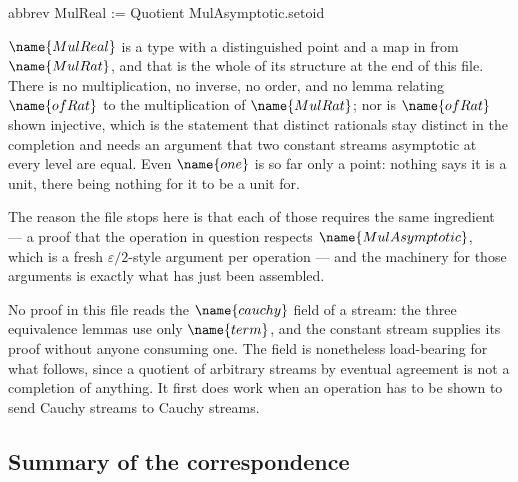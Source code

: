 \begin{leancode}
abbrev MulReal := Quotient MulAsymptotic.setoid
\end{leancode}

\begin{remark}
\label{Completion:rem:what-remains}
$\name{MulReal}$ is a type with a distinguished point and a map in from
$\name{MulRat}$, and that is the whole of its structure at the end of this
file.  There is no multiplication, no inverse, no order, and no lemma
relating $\name{ofRat}$ to the multiplication of $\name{MulRat}$; nor is
$\name{ofRat}$ shown injective, which is the statement that distinct rationals
stay distinct in the completion and needs an argument that two constant streams
asymptotic at every level are equal.  Even $\name{one}$ is so far only a point:
nothing says it is a unit, there being nothing for it to be a unit for.

The reason the file stops here is that each of those requires the same
ingredient --- a proof that the operation in question respects
$\name{MulAsymptotic}$, which is a fresh $\varepsilon/2$-style argument per
operation --- and the machinery for those arguments is exactly what has just
been assembled.
\end{remark}

\begin{remark}\label{Completion:rem:inert}
No proof in this file reads the $\name{cauchy}$ field of a stream: the three
equivalence lemmas use only $\name{term}$, and the constant stream supplies its
proof without anyone consuming one.  The field is nonetheless load-bearing for
what follows, since a quotient of arbitrary streams by eventual agreement is
not a completion of anything.  It first does work when an operation has to be
shown to send Cauchy streams to Cauchy streams.
\end{remark}

\subsection*{Summary of the correspondence}

